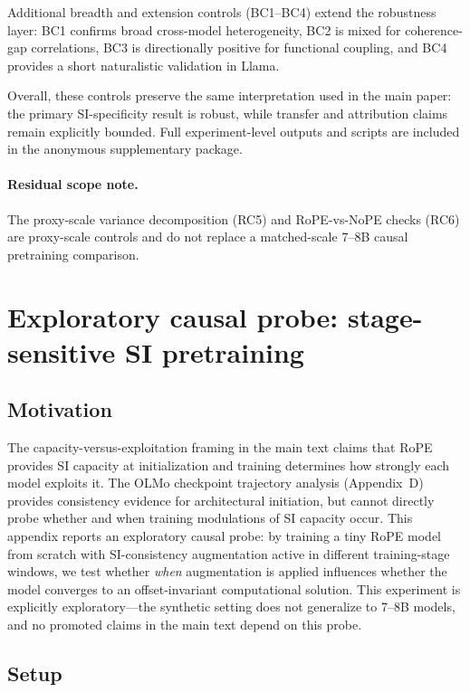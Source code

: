 \documentclass{article}
\begin{document}
Additional breadth and extension controls (BC1--BC4) extend the robustness layer: BC1 confirms broad cross-model heterogeneity, BC2 is mixed for coherence-gap correlations, BC3 is directionally positive for functional coupling, and BC4 provides a short naturalistic validation in Llama.

Overall, these controls preserve the same interpretation used in the main paper: the primary SI-specificity result is robust, while transfer and attribution claims remain explicitly bounded. Full experiment-level outputs and scripts are included in the anonymous supplementary package.

\paragraph{Residual scope note.}
The proxy-scale variance decomposition (RC5) and RoPE-vs-NoPE checks (RC6) are proxy-scale controls and do not replace a matched-scale 7--8B causal pretraining comparison.


\section{Exploratory causal probe: stage-sensitive SI pretraining}
\label{app:e23}

\subsection{Motivation}

The capacity-versus-exploitation framing in the main text claims that RoPE provides SI capacity at initialization and training determines how strongly each model exploits it. The OLMo checkpoint trajectory analysis (Appendix~D) provides consistency evidence for architectural initiation, but cannot directly probe whether and when training modulations of SI capacity occur. This appendix reports an exploratory causal probe: by training a tiny RoPE model from scratch with SI-consistency augmentation active in different training-stage windows, we test whether \textit{when} augmentation is applied influences whether the model converges to an offset-invariant computational solution. This experiment is explicitly exploratory---the synthetic setting does not generalize to 7--8B models, and no promoted claims in the main text depend on this probe.

\subsection{Setup}
\end{document}
